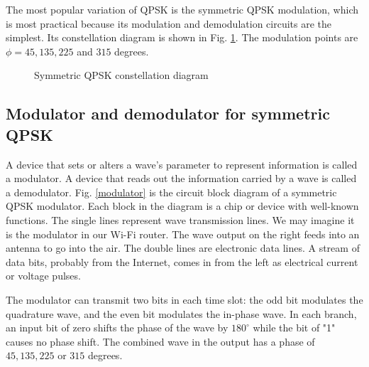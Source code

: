 \documentclass[oneside, letter, 12pt]{book}
\begin{document}
The most popular variation of QPSK is the symmetric QPSK modulation, which is most practical because its modulation and demodulation circuits are the simplest. Its constellation diagram is shown in Fig. \ref{sQPSK}. The modulation points are $\phi = 45, 135, 225$ and $315$ degrees.
\begin{figure}[h]\label{sQPSK}
\caption{Symmetric QPSK constellation diagram}
\end{figure}

\subsection{Modulator and demodulator for symmetric QPSK}\label{Sec-demodulator}
A device that sets or alters a wave's parameter to represent information is called a modulator. A device that reads out the information carried by a wave is called a demodulator. Fig. \ref{modulator} is the circuit block diagram of a symmetric QPSK modulator. Each block in the diagram is a chip or device with well-known functions. The single lines represent wave transmission lines. We may imagine it is the modulator in our Wi-Fi router. The wave output on the right feeds into an antenna to go into the air. The double lines are electronic data lines. A stream of data bits, probably from the Internet, comes in from the left as electrical current or voltage pulses.

The modulator can transmit two bits in each time slot: the odd bit modulates the quadrature wave, and the even bit modulates the in-phase wave. In each branch, an input bit of zero shifts the phase of the wave by $180^\circ$ while the bit of "1" causes no phase shift. The combined wave in the output has a phase of $45, 135, 225$ or $315$ degrees.
\end{document}
